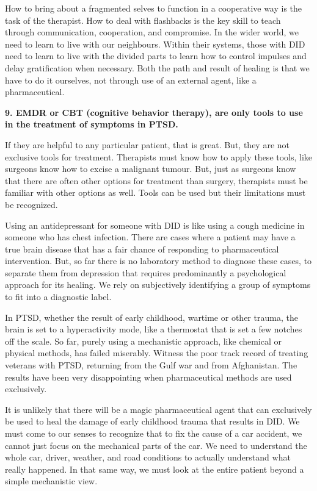 \documentclass[]{book}
\begin{document}
How to bring about a fragmented selves to function in a cooperative way is the task of the therapist. How to deal with flashbacks is the key skill to teach through communication, cooperation, and compromise. In the wider world, we need to learn to live with our neighbours. Within their systems, those with DID need to learn to live with the divided parts to learn how to control impulses and delay gratification when necessary. Both the path and result of healing is that we have to do it ourselves, not through use of an external agent, like a pharmaceutical.

\textbf{9. EMDR or CBT (cognitive behavior therapy), are only tools to use in the treatment of symptoms in PTSD.}

If they are helpful to any particular patient, that is great. But, they are not exclusive tools for treatment. Therapists must know how to apply these tools, like surgeons know how to excise a malignant tumour. But, just as surgeons know that there are often other options for treatment than surgery, therapists must be familiar with other options as well. Tools can be used but their limitations must be recognized.

Using an antidepressant for someone with DID is like using a cough medicine in someone who has chest infection. There are cases where a patient may have a true brain disease that has a fair chance of responding to pharmaceutical intervention. But, so far there is no laboratory method to diagnose these cases, to separate them from depression that requires predominantly a psychological approach for its healing. We rely on subjectively identifying a group of symptoms to fit into a diagnostic label.

In PTSD, whether the result of early childhood, wartime or other trauma, the brain is set to a hyperactivity mode, like a thermostat that is set a few notches off the scale. So far, purely using a mechanistic approach, like chemical or physical methods, has failed miserably. Witness the poor track record of treating veterans with PTSD, returning from the Gulf war and from Afghanistan. The results have been very disappointing when pharmaceutical methods are used exclusively.

It is unlikely that there will be a magic pharmaceutical agent that can exclusively be used to heal the damage of early childhood trauma that results in DID. We must come to our senses to recognize that to fix the cause of a car accident, we cannot just focus on the mechanical parts of the car. We need to understand the whole car, driver, weather, and road conditions to actually understand what really happened. In that same way, we must look at the entire patient beyond a simple mechanistic view.
\end{document}
